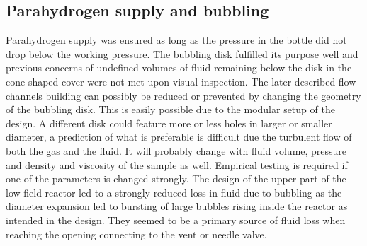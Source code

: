         \subsection{Parahydrogen supply and bubbling}
            Parahydrogen supply was ensured as long as the pressure in the bottle did not drop below the working pressure. The bubbling disk fulfilled its purpose well and previous concerns of undefined volumes of fluid remaining below the disk in the cone shaped cover were not met upon visual inspection. The later described flow channels building can possibly be reduced or prevented by changing the geometry of the bubbling disk. This is easily possible due to the modular setup of the design. A different disk could feature more or less holes in larger or smaller diameter, a prediction of what is preferable is difficult due the turbulent flow of both the gas and the fluid. It will probably change with fluid volume, pressure and density and viscosity of the sample as well. Empirical testing is required if one of the parameters is changed strongly.
            The design of the upper part of the low field reactor led to a strongly reduced loss in fluid due to bubbling as the diameter expansion led to bursting of large bubbles rising inside the reactor as intended in the design. They seemed to be a primary source of fluid loss when reaching the opening connecting to the vent or needle valve.
